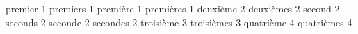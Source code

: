 %
%
%

%
%

premier             1\noexpand\ier%
premiers            1\noexpand\iers%
premi\`{e}re            1\noexpand\iere%
premi\`{e}res           1\noexpand\ieres%
deuxi\`{e}me            2\noexpand\ieme%
deuxi\`{e}mes           2\noexpand\iemes%
second              2\noexpand{}%
seconds             2\noexpand{}%
seconde             2\noexpand{}%
secondes            2\noexpand{}%
troisi\`{e}me           3\noexpand\ieme%
troisi\`{e}mes          3\noexpand\iemes%
quatri\`{e}me           4\noexpand\ieme%
quatri\`{e}mes          4\noexpand\iemes%

